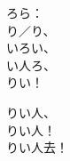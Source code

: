 \documentclass{ctexart}
\begin{document}
\noindent
\begin{minipage}[t]{6cm}
ろら：\\
り／り、\\
いろい、\\
い人ろ、\\
りい！\\
\end{minipage}
\begin{minipage}[t]{7cm}
りい人、\\
りい人！\\
りい人去！\\
\end{minipage}
\end{document}

